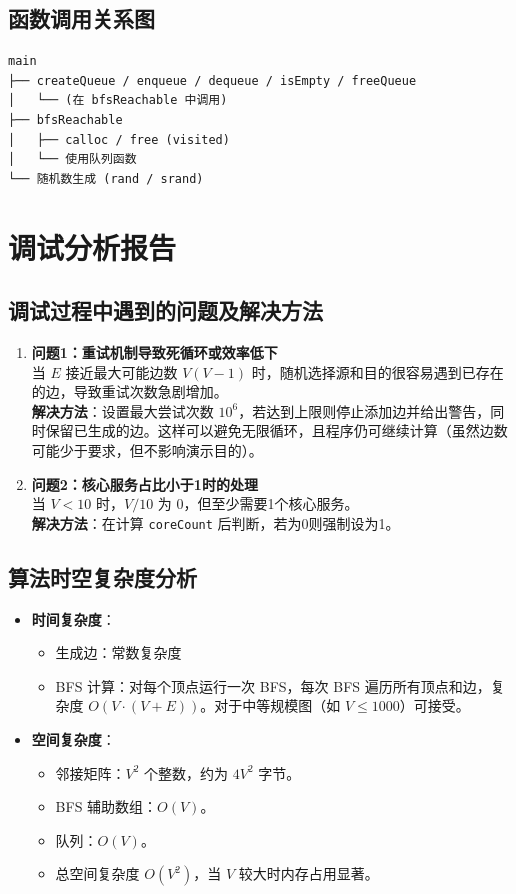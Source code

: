 \documentclass[UTF8]{ctexart}
\begin{document}
\subsection{函数调用关系图}
\begin{verbatim}
main
├── createQueue / enqueue / dequeue / isEmpty / freeQueue
│   └── (在 bfsReachable 中调用)
├── bfsReachable
│   ├── calloc / free (visited)
│   └── 使用队列函数
└── 随机数生成 (rand / srand)
\end{verbatim}

\section{调试分析报告}

\subsection{调试过程中遇到的问题及解决方法}
\begin{enumerate}
    \item \textbf{问题1：重试机制导致死循环或效率低下} \\
    当 \(E\) 接近最大可能边数 \(V(V-1)\) 时，随机选择源和目的很容易遇到已存在的边，导致重试次数急剧增加。 \\
    \textbf{解决方法}：设置最大尝试次数 \(10^6\)，若达到上限则停止添加边并给出警告，同时保留已生成的边。这样可以避免无限循环，且程序仍可继续计算（虽然边数可能少于要求，但不影响演示目的）。

    \item \textbf{问题2：核心服务占比小于1时的处理} \\
    当 \(V < 10\) 时，\(V/10\) 为 0，但至少需要1个核心服务。 \\
    \textbf{解决方法}：在计算 \texttt{coreCount} 后判断，若为0则强制设为1。
\end{enumerate}

\subsection{算法时空复杂度分析}
\begin{itemize}
    \item \textbf{时间复杂度}：
        \begin{itemize}
            \item 生成边：常数复杂度
            \item BFS 计算：对每个顶点运行一次 BFS，每次 BFS 遍历所有顶点和边，复杂度 \(O(V \cdot (V+E))\)。对于中等规模图（如 \(V \leq 1000\)）可接受。
        \end{itemize}
    \item \textbf{空间复杂度}：
        \begin{itemize}
            \item 邻接矩阵：\(V^2\) 个整数，约为 \(4V^2\) 字节。
            \item BFS 辅助数组：\(O(V)\)。
            \item 队列：\(O(V)\)。
            \item 总空间复杂度 \(O(V^2)\)，当 \(V\) 较大时内存占用显著。
        \end{itemize}
\end{itemize}
\end{document}
